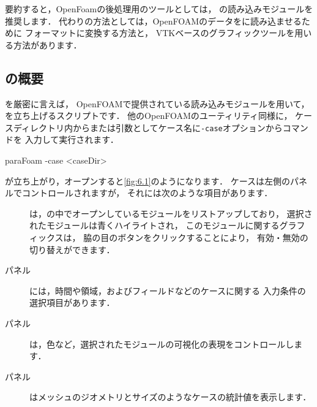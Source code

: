 要約すると，OpenFoamの後処理用のツールとしては，
の読み込みモジュールを推奨します．
代わりの方法としては，OpenFOAMのデータをに読み込ませるために
フォーマットに変換する方法と，
VTKベースのグラフィックツールを用いる方法があります．


\subsection{の概要}
\label{ssec:6.1.1}
を厳密に言えば，
OpenFOAMで提供されている読み込みモジュールを用いて，
を立ち上げるスクリプトです．
他のOpenFOAMのユーティリティ同様に，
ケースディレクトリ内からまたは引数としてケース名に\texttt{-case}オプションからコマンドを
入力して実行されます．
\begin{OFverbatim}[terminal]
paraFoam -case <caseDir>
\end{OFverbatim}
が立ち上がり，オープンすると\autoref{fig:6.1}のようになります．
ケースは左側のパネルでコントロールされますが，
それには次のような項目があります．
\begin{description}
 \item[]
%
%
            は，の中でオープンしているモジュールをリストアップしており，
            選択されたモジュールは青くハイライトされ，
            このモジュールに関するグラフィックスは，
            脇の目のボタンをクリックすることにより，
            有効・無効の切り替えができます．
 \item[パネル]
%
%
            には，時間や領域，およびフィールドなどのケースに関する
            入力条件の選択項目があります．
 \item[パネル]
%
%
            は，色など，選択されたモジュールの可視化の表現をコントロールします．
 \item[パネル]
%
%
            はメッシュのジオメトリとサイズのようなケースの統計値を表示します．
\end{description}



